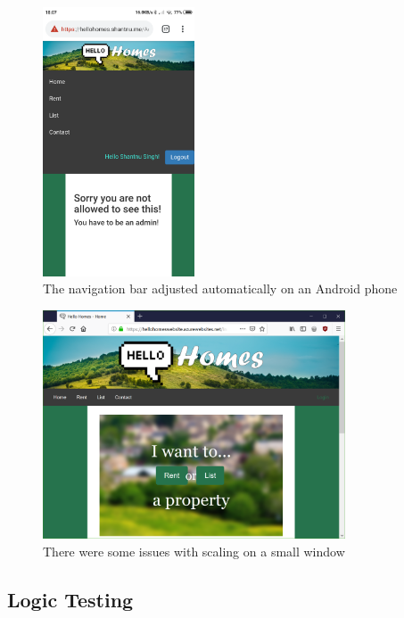 \documentclass{article}
\begin{document}
            \begin{figure}[!htb]
                \centering
                \includegraphics[width=0.4\textwidth]{figures/android.png}
                \caption[Android Scaling]{The navigation bar adjusted automatically on an Android phone}
                \label{fig:android}
            \end{figure}

            \begin{figure}[!htb]
                \centering
                \includegraphics[width=0.8\textwidth]{figures/small_window.png}
                \caption[Small Window]{There were some issues with scaling on a small window}
                \label{fig:small_display}
            \end{figure}

    \subsection{Logic Testing}
\end{document}
